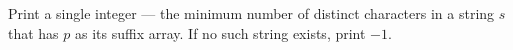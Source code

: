 Print a single integer --- the minimum number of distinct characters in a string $s$ that has $p$ as its suffix array. If no such string exists, print $-1$.
